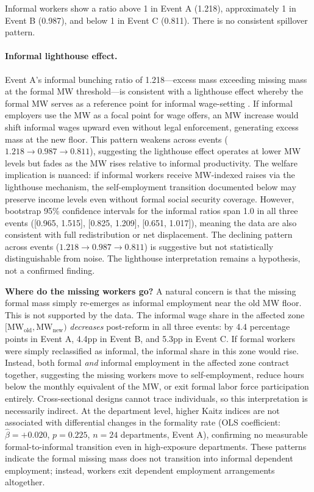 \documentclass[12pt]{article}
\begin{document}
Informal workers show a ratio above 1 in Event A (1.218), approximately 1 in Event B (0.987), and below 1 in Event C (0.811). There is no consistent spillover pattern.

\paragraph{Informal lighthouse effect.} Event A's informal bunching ratio of 1.218---excess mass exceeding missing mass at the formal MW threshold---is consistent with a lighthouse effect whereby the formal MW serves as a reference point for informal wage-setting \citep{jaramillo2004}. If informal employers use the MW as a focal point for wage offers, an MW increase would shift informal wages upward even without legal enforcement, generating excess mass at the new floor. This pattern weakens across events ($1.218 \to 0.987 \to 0.811$), suggesting the lighthouse effect operates at lower MW levels but fades as the MW rises relative to informal productivity. The welfare implication is nuanced: if informal workers receive MW-indexed raises via the lighthouse mechanism, the self-employment transition documented below may preserve income levels even without formal social security coverage. However, bootstrap 95\% confidence intervals for the informal ratios span 1.0 in all three events ([0.965, 1.515], [0.825, 1.209], [0.651, 1.017]), meaning the data are also consistent with full redistribution or net displacement. The declining pattern across events ($1.218 \to 0.987 \to 0.811$) is suggestive but not statistically distinguishable from noise. The lighthouse interpretation remains a hypothesis, not a confirmed finding.

\textbf{Where do the missing workers go?} A natural concern is that the missing formal mass simply re-emerges as informal employment near the old MW floor. This is not supported by the data. The informal wage share in the affected zone $[\text{MW}_\text{old}, \text{MW}_\text{new})$ \textit{decreases} post-reform in all three events: by 4.4 percentage points in Event A, 4.4pp in Event B, and 5.3pp in Event C. If formal workers were simply reclassified as informal, the informal share in this zone would rise. Instead, both formal \textit{and} informal employment in the affected zone contract together, suggesting the missing workers move to self-employment, reduce hours below the monthly equivalent of the MW, or exit formal labor force participation entirely. Cross-sectional designs cannot trace individuals, so this interpretation is necessarily indirect. At the department level, higher Kaitz indices are not associated with differential changes in the formality rate (OLS coefficient: $\hat{\beta} = +0.020$, $p = 0.225$, $n = 24$ departments, Event A), confirming no measurable formal-to-informal transition even in high-exposure departments. These patterns indicate the formal missing mass does not transition into informal dependent employment; instead, workers exit dependent employment arrangements altogether.
\end{document}
